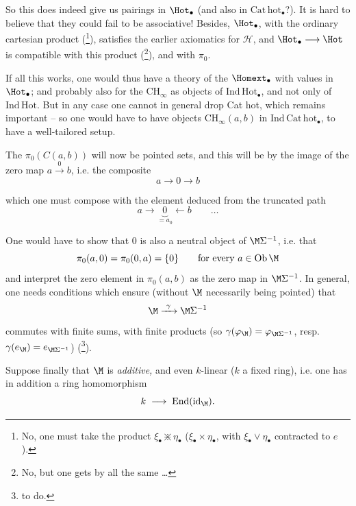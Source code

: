 \noindent{}So this does indeed give us pairings in $\Hot_{\bullet}$ (and also in $\mathrm{Cat\,hot}_{\bullet}$?). It is hard to believe that they could fail to be associative! Besides, $\Hot_{\bullet}$, with the ordinary cartesian product (\footnote[4]{No, one must take the product $\xi_{\bullet} \divideontimes \eta_{\bullet}$ ($\xi_{\bullet}\times\eta_{\bullet}$, with $\xi_{\bullet}\vee\eta_{\bullet}$ contracted to $e$).}), satisfies the earlier axiomatics for $\mathcal{H}$, and $\Hot_{\bullet} \longrightarrow \Hot$ is compatible with this product (\footnote[5]{No, but one gets by all the same \ldots}), and with $\pi_0$. %

If all this works, one would thus have a theory of the $\Homext_{\bullet}$ with values in $\Hot_{\bullet}$; and probably also for the $\mathrm{CH}_{\infty}$ as objects of $\mathrm{Ind\,Hot}_{\bullet}$, and not only of $\mathrm{Ind\,Hot}$. But
in any case one cannot in general drop Cat hot, which remains important -- so one would have to have objects $\mathrm{CH}_{\infty}(a,b)$ in $\mathrm{Ind\,Cat\,hot}_{\bullet}$, to have a well-tailored setup.

The $\pi_0(C(a,b))$ will now be pointed sets, and this will be by the image of the zero map $a \xrightarrow{\ 0\ } b$, i.e. the composite
\[
a \longrightarrow 0 \longrightarrow b
\]


which one must compose with the element deduced from the truncated path %
\[
a \longrightarrow \underbrace{0}_{=a_0} \longleftarrow b \qquad \ldots
\]

One would have to show that 0 is also a neutral object of $\M\Sigma^{-1}$, i.e. that
\[
\pi_0(a,0) = \pi_0(0,a) = \{0\} \qquad \text{for every } a \in \mathrm{Ob}\,\M
\]
and interpret the zero element in $\pi_0(a,b)$ as the zero map in $\M\Sigma^{-1}$. In general, one needs conditions which ensure (without $\M$ necessarily being pointed) that
\[
\M \xrightarrow{\ \gamma\ } \M\Sigma^{-1}
\]
commutes with finite sums, with finite products (so $\gamma(\varphi_{\M}) = \varphi_{\M\Sigma^{-1}}$, resp. $\gamma(e_{\M}) = e_{\M\Sigma^{-1}}$) (\footnote[6]{to do.}).

Suppose finally that $\M$ is \textit{additive,} and even $k$-linear ($k$ a fixed ring), i.e. one has in addition a ring homomorphism
\[
k \;\longrightarrow\; \mathrm{End}(\mathrm{id}_{\M}).
\]

